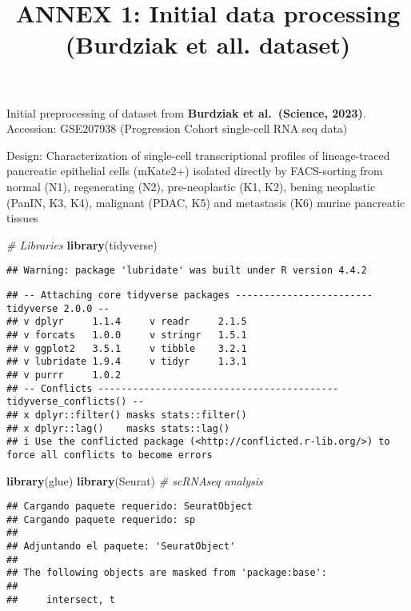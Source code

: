 \documentclass[
]{article}
\title{ANNEX 1: Initial data processing (Burdziak et all. dataset)}
\author{}
\date{\vspace{-2.5em}}
\newenvironment{Shaded}{\begin{snugshade}}{\end{snugshade}}
\newcommand{\CommentTok}[1]{\textcolor[rgb]{0.56,0.35,0.01}{\textit{#1}}}
\newcommand{\FunctionTok}[1]{\textcolor[rgb]{0.13,0.29,0.53}{\textbf{#1}}}
\newcommand{\NormalTok}[1]{#1}
\begin{document}
\maketitle

Initial preprocessing of dataset from \textbf{Burdziak et al.~(Science,
2023)}. Accession: GSE207938 (Progression Cohort single-cell RNA seq
data)

Design: Characterization of single-cell transcriptional profiles of
lineage-traced pancreatic epithelial cells (mKate2+) isolated directly
by FACS-sorting from normal (N1), regenerating (N2), pre-neoplastic (K1,
K2), bening neoplastic (PanIN, K3, K4), malignant (PDAC, K5) and
metastasis (K6) murine pancreatic tissues

\begin{Shaded}
\begin{Highlighting}[]
\CommentTok{\# Libraries}
\FunctionTok{library}\NormalTok{(tidyverse)}
\end{Highlighting}
\end{Shaded}

\begin{verbatim}
## Warning: package 'lubridate' was built under R version 4.4.2
\end{verbatim}

\begin{verbatim}
## -- Attaching core tidyverse packages ------------------------ tidyverse 2.0.0 --
## v dplyr     1.1.4     v readr     2.1.5
## v forcats   1.0.0     v stringr   1.5.1
## v ggplot2   3.5.1     v tibble    3.2.1
## v lubridate 1.9.4     v tidyr     1.3.1
## v purrr     1.0.2     
## -- Conflicts ------------------------------------------ tidyverse_conflicts() --
## x dplyr::filter() masks stats::filter()
## x dplyr::lag()    masks stats::lag()
## i Use the conflicted package (<http://conflicted.r-lib.org/>) to force all conflicts to become errors
\end{verbatim}

\begin{Shaded}
\begin{Highlighting}[]
\FunctionTok{library}\NormalTok{(glue)}
\FunctionTok{library}\NormalTok{(Seurat)    }\CommentTok{\# scRNAseq analysis}
\end{Highlighting}
\end{Shaded}

\begin{verbatim}
## Cargando paquete requerido: SeuratObject
## Cargando paquete requerido: sp
## 
## Adjuntando el paquete: 'SeuratObject'
## 
## The following objects are masked from 'package:base':
## 
##     intersect, t
\end{verbatim}
\end{document}
